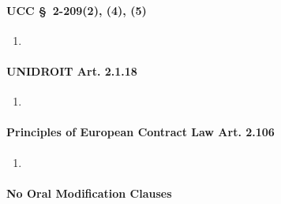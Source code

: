 \paragraph{UCC \S\ 2-209(2), (4), (5)}

\begin{enumerate}
    \item %
\end{enumerate}

\paragraph{UNIDROIT Art. 2.1.18}

\begin{enumerate}
    \item %
\end{enumerate}

\paragraph{Principles of European Contract Law Art. 2.106}

\begin{enumerate}
    \item %
\end{enumerate}

\paragraph{No Oral Modification Clauses}

